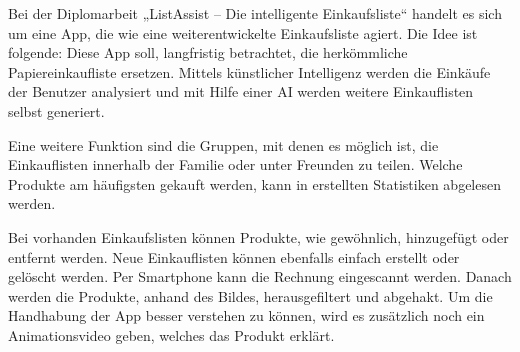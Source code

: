 Bei der Diplomarbeit „ListAssist -- Die intelligente Einkaufsliste“ handelt es sich um 
eine App, die wie eine weiterentwickelte Einkaufsliste agiert.
Die Idee ist folgende: Diese App soll, langfristig betrachtet, die 
herkömmliche Papiereinkaufliste ersetzen. Mittels künstlicher Intelligenz 
werden die Einkäufe der Benutzer analysiert und mit Hilfe einer AI werden
weitere Einkauflisten selbst generiert.

Eine weitere Funktion sind die Gruppen, mit denen es möglich ist, 
die Einkauflisten innerhalb der Familie oder unter Freunden zu teilen.
Welche Produkte am häufigsten gekauft werden, kann in erstellten
Statistiken abgelesen werden.

Bei vorhanden Einkaufslisten können Produkte, wie gewöhnlich,
hinzugefügt oder entfernt werden. Neue Einkauflisten können 
ebenfalls einfach erstellt oder gelöscht werden. Per Smartphone
kann die Rechnung eingescannt werden. Danach werden die Produkte, 
anhand des Bildes, herausgefiltert und abgehakt.
Um die Handhabung der App besser verstehen zu können, wird 
es zusätzlich noch ein Animationsvideo geben, welches das Produkt erklärt.
